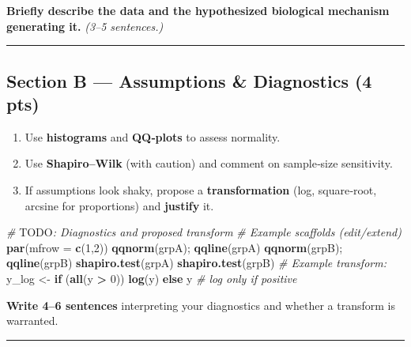 \documentclass[
  11pt,
]{article}
\newenvironment{Shaded}{\begin{snugshade}}{\end{snugshade}}
\newcommand{\AlertTok}[1]{\textcolor[rgb]{0.94,0.16,0.16}{#1}}
\newcommand{\AttributeTok}[1]{\textcolor[rgb]{0.13,0.29,0.53}{#1}}
\newcommand{\CommentTok}[1]{\textcolor[rgb]{0.56,0.35,0.01}{\textit{#1}}}
\newcommand{\ControlFlowTok}[1]{\textcolor[rgb]{0.13,0.29,0.53}{\textbf{#1}}}
\newcommand{\DecValTok}[1]{\textcolor[rgb]{0.00,0.00,0.81}{#1}}
\newcommand{\FunctionTok}[1]{\textcolor[rgb]{0.13,0.29,0.53}{\textbf{#1}}}
\newcommand{\NormalTok}[1]{#1}
\newcommand{\OtherTok}[1]{\textcolor[rgb]{0.56,0.35,0.01}{#1}}
\newcommand{\SpecialCharTok}[1]{\textcolor[rgb]{0.81,0.36,0.00}{\textbf{#1}}}
\providecommand{\tightlist}{%
  \setlength{\itemsep}{0pt}\setlength{\parskip}{0pt}}
\begin{document}
\textbf{Briefly describe the data and the hypothesized biological
mechanism generating it.} \emph{(3--5 sentences.)}

\begin{center}\rule{0.5\linewidth}{0.5pt}\end{center}

\subsection{Section B --- Assumptions \& Diagnostics (4
pts)}\label{section-b-assumptions-diagnostics-4-pts}

\begin{enumerate}
\def\labelenumi{\arabic{enumi}.}
\tightlist
\item
  Use \textbf{histograms} and \textbf{QQ‑plots} to assess normality.
\item
  Use \textbf{Shapiro--Wilk} (with caution) and comment on sample‑size
  sensitivity.
\item
  If assumptions look shaky, propose a \textbf{transformation} (log,
  square‑root, arcsine for proportions) and \textbf{justify} it.
\end{enumerate}

\begin{Shaded}
\begin{Highlighting}[]
\CommentTok{\# }\AlertTok{TODO}\CommentTok{: Diagnostics and proposed transform}
\CommentTok{\# Example scaffolds (edit/extend)}
\FunctionTok{par}\NormalTok{(}\AttributeTok{mfrow =} \FunctionTok{c}\NormalTok{(}\DecValTok{1}\NormalTok{,}\DecValTok{2}\NormalTok{))}
\FunctionTok{qqnorm}\NormalTok{(grpA); }\FunctionTok{qqline}\NormalTok{(grpA)}
\FunctionTok{qqnorm}\NormalTok{(grpB); }\FunctionTok{qqline}\NormalTok{(grpB)}
\FunctionTok{shapiro.test}\NormalTok{(grpA)}
\FunctionTok{shapiro.test}\NormalTok{(grpB)}
\CommentTok{\# Example transform:}
\NormalTok{y\_log }\OtherTok{\textless{}{-}} \ControlFlowTok{if}\NormalTok{ (}\FunctionTok{all}\NormalTok{(y }\SpecialCharTok{\textgreater{}} \DecValTok{0}\NormalTok{)) }\FunctionTok{log}\NormalTok{(y) }\ControlFlowTok{else}\NormalTok{ y  }\CommentTok{\# log only if positive}
\end{Highlighting}
\end{Shaded}

\textbf{Write 4--6 sentences} interpreting your diagnostics and whether
a transform is warranted.

\begin{center}\rule{0.5\linewidth}{0.5pt}\end{center}
\end{document}

